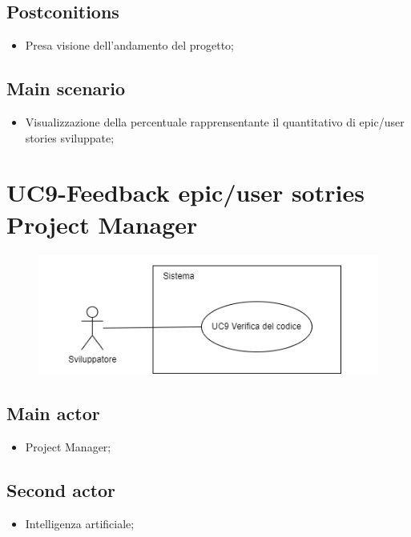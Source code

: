 \documentclass{article}
\begin{document}
    \subsection*{Postconitions}
        \begin{itemize}
            \item Presa visione dell'andamento del progetto;
        \end{itemize}
        
    \subsection*{Main scenario}
        
        \begin{itemize}
            \item Visualizzazione della percentuale rapprensentante il quantitativo di epic/user stories sviluppate;
        \end{itemize}
        

\section{UC9-Feedback epic/user sotries Project Manager}
    \begin{figure}[h]
      \centering
      \includegraphics{./imgUML/UC9.png}
      \label{fig:immagine}
    \end{figure}
    \subsection*{Main actor}
    \begin{itemize}
        \item Project Manager;
    \end{itemize}
    \subsection{Second actor}
    \begin{itemize}
        \item Intelligenza artificiale;
    \end{itemize}
    
\end{document}

